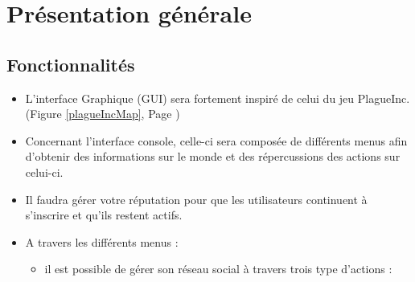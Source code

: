 \chapter{Présentation générale}
\label{chap:presentationgenerale}

\section{Fonctionnalités}

\begin{itemize}
    \item L'interface Graphique (GUI) sera fortement inspiré de celui du jeu PlagueInc. (Figure \ref{plagueIncMap}, Page \pageref{plagueIncMap})
    \item Concernant l'interface console, celle-ci sera composée de différents menus afin d'obtenir des informations sur le monde et des répercussions des actions sur celui-ci.
    
    \item Il faudra gérer votre réputation pour que les utilisateurs continuent à s'inscrire et qu'ils restent actifs.
    
    \item A travers les différents menus :
    
    \begin{itemize}
        \item il est possible de gérer son réseau social à travers trois type d'actions :
    

\end{itemize}
\end{itemize}

